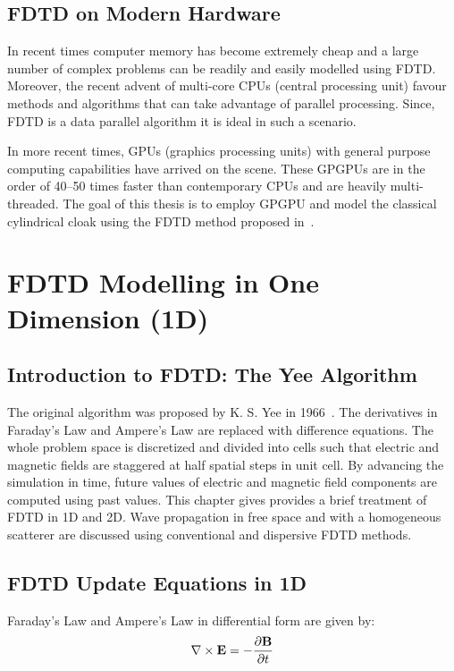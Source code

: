 \documentclass{report}
\begin{document}
\section{FDTD on Modern Hardware}
In recent times computer memory has become extremely cheap and a large number of complex problems can be readily and easily modelled using FDTD. Moreover, the recent advent of multi-core CPUs (central processing unit) favour methods and algorithms that can take advantage of parallel processing. Since, FDTD is a data parallel algorithm it is ideal in such a scenario.

In more recent times, GPUs (graphics processing units) with general purpose computing capabilities have arrived on the scene. These GPGPUs are in the order of 40--50 times faster than contemporary CPUs and are heavily multi-threaded. The goal of this thesis is to employ GPGPU and model the classical cylindrical cloak using the FDTD method proposed in~\cite{Radial-Zhao}.

\chapter{FDTD Modelling in One Dimension (1D)}

\section{Introduction to FDTD: The Yee Algorithm}

The original algorithm was proposed by K. S. Yee in 1966~\cite{Yee1966}. The derivatives in Faraday's Law and Ampere's Law are replaced with difference equations. The whole problem space is discretized and divided into cells such that electric and magnetic fields are staggered at half spatial steps in unit cell. By advancing the simulation in time, future values of electric and magnetic field components are computed using past values. This chapter gives provides a brief treatment of FDTD in 1D and 2D. Wave propagation in free space and with a homogeneous scatterer are discussed using conventional and dispersive FDTD methods.

\section{FDTD Update Equations in 1D}
Faraday's Law and Ampere's Law in differential form are given by:
\begin{equation}
\centering
\nabla \times \textbf{E} = - \dfrac{\partial \textbf{B}}{\partial t}
\label{Faraday's Law}
\end{equation}
\end{document}
